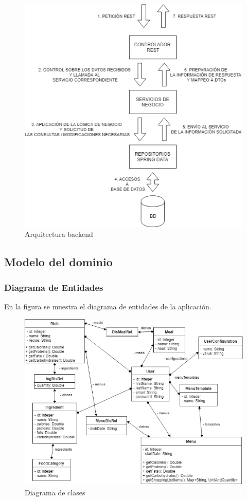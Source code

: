 \documentclass[12pt, a4paper, twoside]{book}
\begin{document}
	\begin{figure}[H]
		\centering
		\includegraphics[width=12cm]{Imagenes/ArquitecturaBack.png}
		\caption{Arquitectura backend}\label{Arquitectura backend}
	\end{figure}
	
	\subsection{Modelo del dominio}    
	\subsubsection{Diagrama de Entidades}
	En la figura se muestra el diagrama de entidades de la aplicación.
	\begin{figure}[H]
		\centering
		\includegraphics[width=15cm]{Imagenes/DiagramaClases.png}
		\caption{Diagrama de clases}\label{Diagrama de clases}
	\end{figure}	
	
\end{document}
